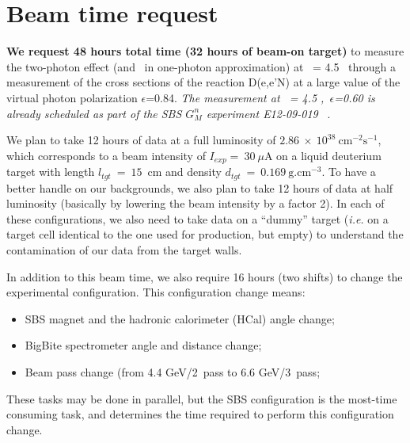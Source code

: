 \section{Beam time request}

{\bf We request 48 hours total time (32 hours of beam-on target)} to measure the two-photon effect (and \gen~in one-photon approximation) 
at \qsq~= 4.5 \gevcsq~through a measurement of the cross sections of the reaction D(e,e'N) at a large value of the virtual photon polarization $\epsilon$=0.84.
{\em The measurement at \qsq~= 4.5 \gevcsq,~$\epsilon$=0.60 is already scheduled as part of the SBS $G_M^n$ experiment E12-09-019}~ \cite{E12-09-019}.

We plan to take 12 hours of data at a full luminosity of $2.86~\times~10^{38}~\mathrm{cm}^{-2}\mathrm{s}^{-1}$, which corresponds to a beam intensity of $I_{exp} =~30~\mu$A on a liquid deuterium target with length $l_{tgt}~=~15$~cm and density $d_{tgt}~=~0.169~\mathrm{g.cm}^{-3}$. 
To have a better handle on our backgrounds, we also plan to take 12 hours of data at half luminosity (basically by lowering the beam intensity by a factor 2).
In each of these configurations, we also need to take data on a ``dummy'' target ({\it i.e.} on a target cell identical to the one used for production, but empty) to understand the contamination of our data from the target walls.

In addition to this beam time, we also require 16 hours (two shifts) to change the experimental configuration.
This configuration change means:
%
\begin{itemize}
\item{SBS magnet and the hadronic calorimeter (HCal) angle change;}
\item{BigBite spectrometer angle and distance change;}
\item{Beam pass change (from 4.4 GeV/2~pass to 6.6 GeV/3~pass;}
\end{itemize}
%
These tasks may be done in parallel, but the SBS configuration is the most-time consuming task, and determines the time required to perform this configuration change.

